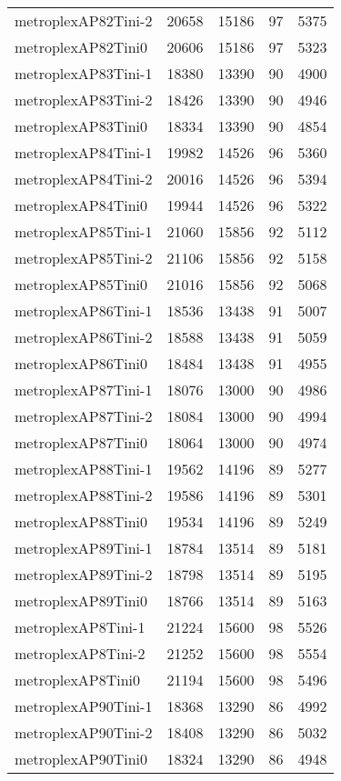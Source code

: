 \begin{tabular}{lrrrr}
metroplexAP82Tini-2 & 20658 & 15186 & 97 & 5375 \\
metroplexAP82Tini0 & 20606 & 15186 & 97 & 5323 \\
metroplexAP83Tini-1 & 18380 & 13390 & 90 & 4900 \\
metroplexAP83Tini-2 & 18426 & 13390 & 90 & 4946 \\
metroplexAP83Tini0 & 18334 & 13390 & 90 & 4854 \\
metroplexAP84Tini-1 & 19982 & 14526 & 96 & 5360 \\
metroplexAP84Tini-2 & 20016 & 14526 & 96 & 5394 \\
metroplexAP84Tini0 & 19944 & 14526 & 96 & 5322 \\
metroplexAP85Tini-1 & 21060 & 15856 & 92 & 5112 \\
metroplexAP85Tini-2 & 21106 & 15856 & 92 & 5158 \\
metroplexAP85Tini0 & 21016 & 15856 & 92 & 5068 \\
metroplexAP86Tini-1 & 18536 & 13438 & 91 & 5007 \\
metroplexAP86Tini-2 & 18588 & 13438 & 91 & 5059 \\
metroplexAP86Tini0 & 18484 & 13438 & 91 & 4955 \\
metroplexAP87Tini-1 & 18076 & 13000 & 90 & 4986 \\
metroplexAP87Tini-2 & 18084 & 13000 & 90 & 4994 \\
metroplexAP87Tini0 & 18064 & 13000 & 90 & 4974 \\
metroplexAP88Tini-1 & 19562 & 14196 & 89 & 5277 \\
metroplexAP88Tini-2 & 19586 & 14196 & 89 & 5301 \\
metroplexAP88Tini0 & 19534 & 14196 & 89 & 5249 \\
metroplexAP89Tini-1 & 18784 & 13514 & 89 & 5181 \\
metroplexAP89Tini-2 & 18798 & 13514 & 89 & 5195 \\
metroplexAP89Tini0 & 18766 & 13514 & 89 & 5163 \\
metroplexAP8Tini-1 & 21224 & 15600 & 98 & 5526 \\
metroplexAP8Tini-2 & 21252 & 15600 & 98 & 5554 \\
metroplexAP8Tini0 & 21194 & 15600 & 98 & 5496 \\
metroplexAP90Tini-1 & 18368 & 13290 & 86 & 4992 \\
metroplexAP90Tini-2 & 18408 & 13290 & 86 & 5032 \\
metroplexAP90Tini0 & 18324 & 13290 & 86 & 4948 \\

\end{tabular}
